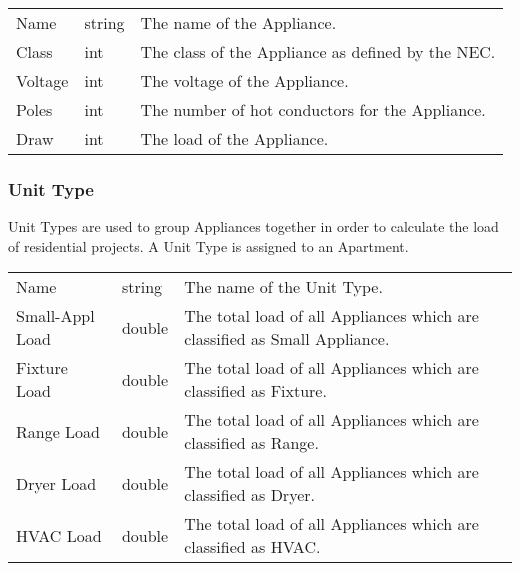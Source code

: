 \documentclass[letterpaper,10pt,english]{sphinxmanual}
\begin{document}
\begin{savenotes}\sphinxattablestart
\centering
\begin{tabulary}{\linewidth}[t]{|T|T|T|}
\hline
\sphinxstyletheadfamily 
{}
&\sphinxstyletheadfamily 
{}
&\sphinxstyletheadfamily 
{}
\\
\hline
Name
&
string
&
The name of the Appliance.
\\
\hline
Class
&
int
&
The class of the Appliance as defined by the NEC.
\\
\hline
Voltage
&
int
&
The voltage of the Appliance.
\\
\hline
Poles
&
int
&
The number of hot conductors for the Appliance.
\\
\hline
Draw
&
int
&
The load of the Appliance.
\\
\hline
\end{tabulary}
\par
\sphinxattableend\end{savenotes}


\subsubsection{Unit Type}
\label{\detokenize{docs/definitions/index-definitions:unit-type}}\label{\detokenize{docs/definitions/index-definitions:unit-type-definition}}
Unit Types are used to group Appliances together in order to calculate the load of residential projects.  A Unit Type is assigned to an Apartment.


\begin{savenotes}\sphinxattablestart
\centering
\begin{tabulary}{\linewidth}[t]{|T|T|T|}
\hline
\sphinxstyletheadfamily 
{}
&\sphinxstyletheadfamily 
{}
&\sphinxstyletheadfamily 
{}
\\
\hline
Name
&
string
&
The name of the Unit Type.
\\
\hline
Small-Appl Load
&
double
&
The total load of all Appliances which are classified as Small Appliance.
\\
\hline
Fixture Load
&
double
&
The total load of all Appliances which are classified as Fixture.
\\
\hline
Range Load
&
double
&
The total load of all Appliances which are classified as Range.
\\
\hline
Dryer Load
&
double
&
The total load of all Appliances which are classified as Dryer.
\\
\hline
HVAC Load
&
double
&
The total load of all Appliances which are classified as HVAC.
\\
\hline
\end{tabulary}
\par
\sphinxattableend\end{savenotes}
\end{document}

